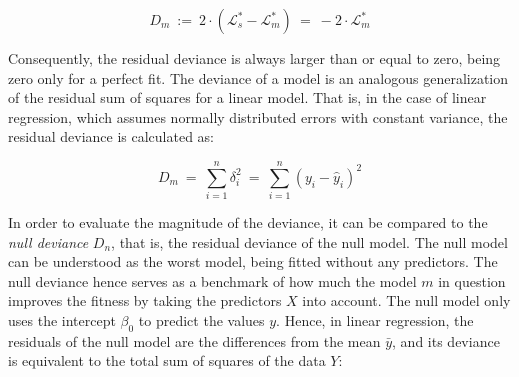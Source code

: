 \begin{equation}
    \label{ch:Factorization:sub:GLM:eq:deviance}
    D_m ~:=~ 2 \cdot ( \mathcal{L}^*_s - \mathcal{L}^*_m ) ~=~ -2 \cdot \mathcal{L}^*_m
\end{equation}

Consequently, the residual deviance is always larger than or equal to zero, being zero only for a perfect fit.
The deviance of a model is an analogous generalization of the residual sum of squares for a linear model.
That is, in the case of linear regression, which assumes normally distributed errors with constant variance,
the residual deviance is calculated as: %

\begin{equation}
    \label{ch:Factorization:sub:GLM:eq:regression}
    D_m ~=~ \sum_{i=1}^{n} \delta_i^2 ~=~ \sum_{i=1}^{n} \left( y_i - \hat{y}_i \right)^2
\end{equation}


In order to evaluate the magnitude of the deviance, it can be compared to the \emph{null deviance} $D_n$,
that is, the residual deviance of the null model.
The null model can be understood as the worst model, being fitted without any predictors.
The null deviance hence serves as a benchmark of how much the model $m$ in question
improves the fitness by taking the predictors $X$ into account.
The null model only uses the intercept $\beta_0$ to predict the values $y$. %
Hence, in linear regression, the residuals of the null model are the differences from the mean $\bar{y}$,
and its deviance is equivalent to the total sum of squares of the data $Y$:

